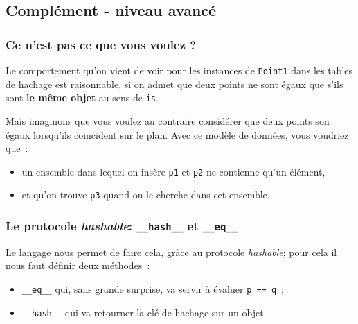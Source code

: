     \hypertarget{compluxe9ment---niveau-avancuxe9}{%
\subsection{Complément - niveau
avancé}\label{compluxe9ment---niveau-avancuxe9}}

    \hypertarget{ce-nest-pas-ce-que-vous-voulez}{%
\subsubsection{Ce n'est pas ce que vous voulez
?}\label{ce-nest-pas-ce-que-vous-voulez}}

    Le comportement qu'on vient de voir pour les instances de
\texttt{Point1} dans les tables de hachage est raisonnable, si on admet
que deux points ne sont égaux que s'ils sont \textbf{le même objet} au
sens de \texttt{is}.

    Mais imaginons que vous voulez au contraire considérer que deux points
son égaux lorsqu'ils coincident sur le plan. Avec ce modèle de données,
vous voudriez que~:

\begin{itemize}
\tightlist
\item
  un ensemble dans lequel on insère \texttt{p1} et \texttt{p2} ne
  contienne qu'un élément,
\item
  et qu'on trouve \texttt{p3} quand on le cherche dans cet ensemble.
\end{itemize}

    \hypertarget{le-protocole-hashable-__hash__-et-__eq__}{%
\subsubsection{\texorpdfstring{Le protocole \emph{hashable}:
\texttt{\_\_hash\_\_} et
\texttt{\_\_eq\_\_}}{Le protocole hashable: \_\_hash\_\_ et \_\_eq\_\_}}\label{le-protocole-hashable-__hash__-et-__eq__}}

    Le langage nous permet de faire cela, grâce au protocole
\emph{hashable}; pour cela il nous faut définir deux méthodes~:

\begin{itemize}
\tightlist
\item
  \texttt{\_\_eq\_\_} qui, sans grande surprise, va servir à évaluer
  \texttt{p\ ==\ q}~;
\item
  \texttt{\_\_hash\_\_} qui va retourner la clé de hachage sur un objet.
\end{itemize}

